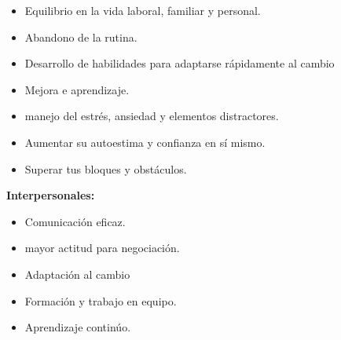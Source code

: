       \begin{itemize}
      \item Equilibrio en la vida laboral, familiar y personal.
      \item Abandono de la rutina.
      \item Desarrollo de habilidades para adaptarse rápidamente al cambio
      \item Mejora e aprendizaje.
      \item manejo del estrés, ansiedad y elementos distractores.
      \item Aumentar su autoestima y confianza en sí mismo.
      \item Superar tus bloques y obstáculos.
      \end{itemize}
      
\textbf{Interpersonales:}    
\begin{itemize}
\item Comunicación eficaz.
\item mayor actitud para negociación.
\item Adaptación al cambio
\item Formación y trabajo en equipo.
\item Aprendizaje continúo.
\end{itemize}

